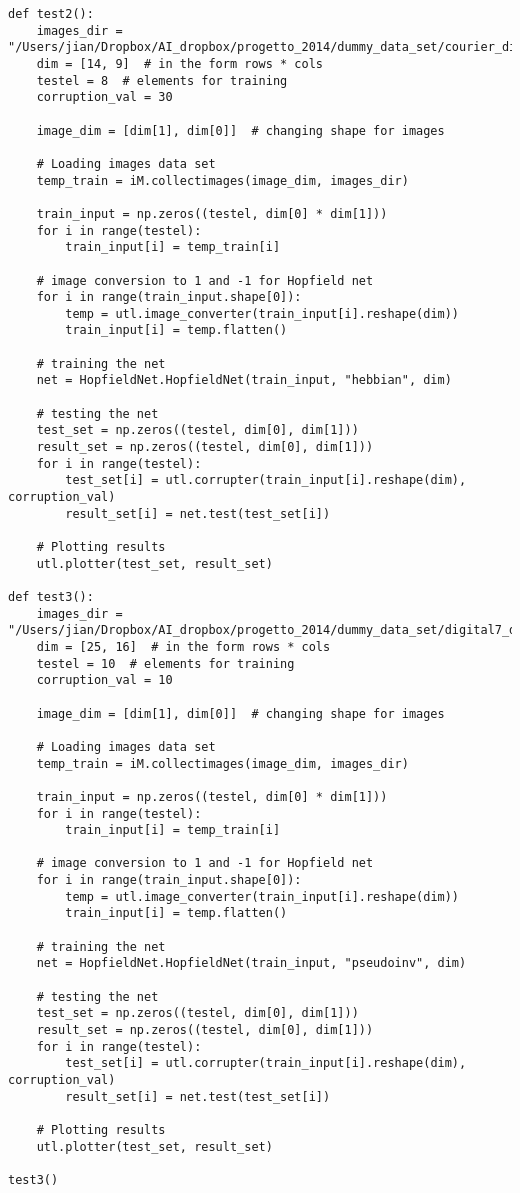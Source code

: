 \documentclass[letterpaper,twocolumn,10pt]{article}
\begin{document}
\begin{lstlisting}
def test2():
    images_dir = "/Users/jian/Dropbox/AI_dropbox/progetto_2014/dummy_data_set/courier_digits_data_set/tiff_images_swidth"
    dim = [14, 9]  # in the form rows * cols
    testel = 8  # elements for training
    corruption_val = 30

    image_dim = [dim[1], dim[0]]  # changing shape for images

    # Loading images data set
    temp_train = iM.collectimages(image_dim, images_dir)

    train_input = np.zeros((testel, dim[0] * dim[1]))
    for i in range(testel):
        train_input[i] = temp_train[i]

    # image conversion to 1 and -1 for Hopfield net
    for i in range(train_input.shape[0]):
        temp = utl.image_converter(train_input[i].reshape(dim))
        train_input[i] = temp.flatten()

    # training the net
    net = HopfieldNet.HopfieldNet(train_input, "hebbian", dim)

    # testing the net
    test_set = np.zeros((testel, dim[0], dim[1]))
    result_set = np.zeros((testel, dim[0], dim[1]))
    for i in range(testel):
        test_set[i] = utl.corrupter(train_input[i].reshape(dim), corruption_val)
        result_set[i] = net.test(test_set[i])

    # Plotting results
    utl.plotter(test_set, result_set)

def test3():
    images_dir = "/Users/jian/Dropbox/AI_dropbox/progetto_2014/dummy_data_set/digital7_digit_data_set/tiff_images_rawcut"
    dim = [25, 16]  # in the form rows * cols
    testel = 10  # elements for training
    corruption_val = 10

    image_dim = [dim[1], dim[0]]  # changing shape for images

    # Loading images data set
    temp_train = iM.collectimages(image_dim, images_dir)

    train_input = np.zeros((testel, dim[0] * dim[1]))
    for i in range(testel):
        train_input[i] = temp_train[i]

    # image conversion to 1 and -1 for Hopfield net
    for i in range(train_input.shape[0]):
        temp = utl.image_converter(train_input[i].reshape(dim))
        train_input[i] = temp.flatten()

    # training the net
    net = HopfieldNet.HopfieldNet(train_input, "pseudoinv", dim)

    # testing the net
    test_set = np.zeros((testel, dim[0], dim[1]))
    result_set = np.zeros((testel, dim[0], dim[1]))
    for i in range(testel):
        test_set[i] = utl.corrupter(train_input[i].reshape(dim), corruption_val)
        result_set[i] = net.test(test_set[i])

    # Plotting results
    utl.plotter(test_set, result_set)

test3()
\end{lstlisting}



\end{document}
